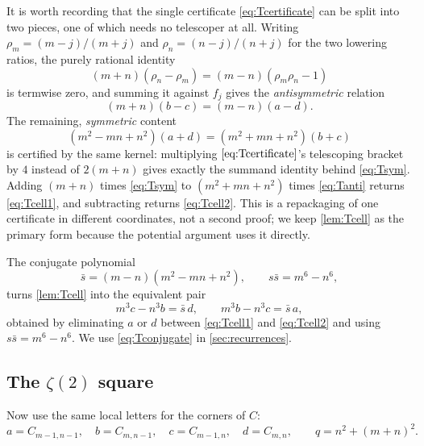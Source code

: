 \documentclass[11pt,letterpaper]{article}
\numberwithin{equation}{section}
\theoremstyle{definition}
\begin{document}
It is worth recording that the single certificate \eqref{eq:Tcertificate}
can be split into two pieces, one of which needs no telescoper at all.
Writing $\rho_m=(m-j)/(m+j)$ and $\rho_n=(n-j)/(n+j)$ for the two
lowering ratios, the purely rational identity
\[
 (m+n)(\rho_n-\rho_m)=(m-n)(\rho_m\rho_n-1)
\]
is termwise zero, and summing it against $f_j$ gives the
\emph{antisymmetric} relation
\begin{equation}\label{eq:Tanti}
 (m+n)(b-c)=(m-n)(a-d).
\end{equation}
The remaining, \emph{symmetric} content
\begin{equation}\label{eq:Tsym}
 (m^2-mn+n^2)(a+d)=(m^2+mn+n^2)(b+c)
\end{equation}
is certified by the same kernel: multiplying $\eqref{eq:Tcertificate}$'s
telescoping bracket by $4$ instead of $2(m+n)$ gives exactly the
summand identity behind \eqref{eq:Tsym}. Adding $(m+n)$ times
\eqref{eq:Tsym} to $(m^2+mn+n^2)$ times \eqref{eq:Tanti} returns
\eqref{eq:Tcell1}, and subtracting returns \eqref{eq:Tcell2}. This is a
repackaging of one certificate in different coordinates, not a second
proof; we keep \cref{lem:Tcell} as the primary form because the potential
argument uses it directly.

The conjugate polynomial
\begin{equation}\label{eq:sbar}
 \bar s=(m-n)(m^2-mn+n^2),\qquad s\bar s=m^6-n^6,
\end{equation}
turns \cref{lem:Tcell} into the equivalent pair
\begin{equation}\label{eq:Tconjugate}
 m^3c-n^3b=\bar s\,d,\qquad m^3b-n^3c=\bar s\,a,
\end{equation}
obtained by eliminating $a$ or $d$ between \eqref{eq:Tcell1} and
\eqref{eq:Tcell2} and using $s\bar s=m^6-n^6$. We use
\eqref{eq:Tconjugate} in \cref{sec:recurrences}.

\subsection{The \texorpdfstring{$\zeta(2)$}{zeta(2)} square}

Now use the same local letters for the corners of $C$:
\[
 a=C_{m-1,n-1},\quad b=C_{m,n-1},\quad
 c=C_{m-1,n},\quad d=C_{m,n},\qquad q=n^2+(m+n)^2.
\]
\end{document}
